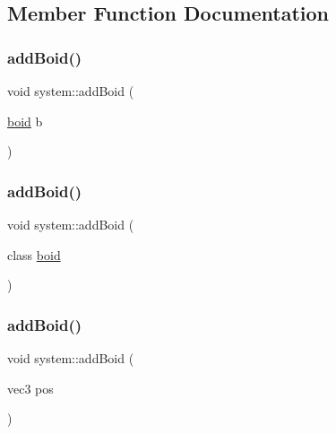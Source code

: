 \subsection{Member Function Documentation}
\mbox{\label{classsystem_af7af840379b2e3471ef14412593780b8}} 
\subsubsection{\texorpdfstring{add\+Boid()}{addBoid()}\hspace{0.1cm}{\footnotesize\ttfamily [1/4]}}
{\footnotesize\ttfamily void system\+::add\+Boid (\begin{DoxyParamCaption}\item[{\mbox{\hyperlink{classboid}{boid}}}]{b }\end{DoxyParamCaption})}

\mbox{\label{classsystem_a5b11d24096427c34764961379e136692}} 
\subsubsection{\texorpdfstring{add\+Boid()}{addBoid()}\hspace{0.1cm}{\footnotesize\ttfamily [2/4]}}
{\footnotesize\ttfamily void system\+::add\+Boid (\begin{DoxyParamCaption}\item[{class \mbox{\hyperlink{classboid}{boid}}}]{ }\end{DoxyParamCaption})}

\mbox{\label{classsystem_a91898e2f06638b8f931bb6fa58bc2f4d}} 
\subsubsection{\texorpdfstring{add\+Boid()}{addBoid()}\hspace{0.1cm}{\footnotesize\ttfamily [3/4]}}
{\footnotesize\ttfamily void system\+::add\+Boid (\begin{DoxyParamCaption}\item[{vec3}]{pos }\end{DoxyParamCaption})}

